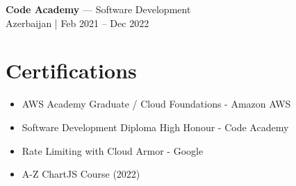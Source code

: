 \documentclass[11pt,a4paper]{article}
\begin{document}
\textbf{Code Academy} — Software Development \\
Azerbaijan | Feb 2021 – Dec 2022

\section*{Certifications}
\begin{itemize}[leftmargin=*]
    \item AWS Academy Graduate / Cloud Foundations - Amazon AWS
    \item Software Development Diploma High Honour - Code Academy
    \item Rate Limiting with Cloud Armor - Google
    \item A-Z ChartJS Course (2022)
\end{itemize}
\end{document}
